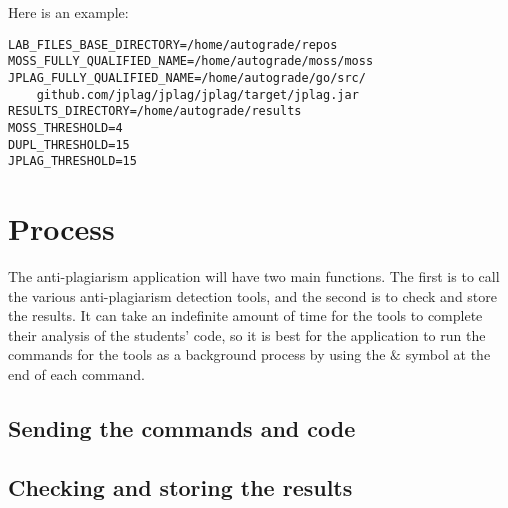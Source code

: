 \documentclass[12pt]{article}
\begin{document}
		Here is an example:
		\begin{lstlisting}
LAB_FILES_BASE_DIRECTORY=/home/autograde/repos
MOSS_FULLY_QUALIFIED_NAME=/home/autograde/moss/moss
JPLAG_FULLY_QUALIFIED_NAME=/home/autograde/go/src/
	github.com/jplag/jplag/jplag/target/jplag.jar
RESULTS_DIRECTORY=/home/autograde/results
MOSS_THRESHOLD=4
DUPL_THRESHOLD=15
JPLAG_THRESHOLD=15
		\end{lstlisting}		

	\section{Process}
		The anti-plagiarism application will have two main functions. The first is to call the various anti-plagiarism detection tools, and the second is to check and store the results. It can take an indefinite amount of time for the tools to complete their analysis of the students' code, so it is best for the application to run the commands for the tools as a background process by using the $\&$ symbol at the end of each command.
		
		\subsection{Sending the commands and code}
			
		\subsection{Checking and storing the results}
\end{document}
